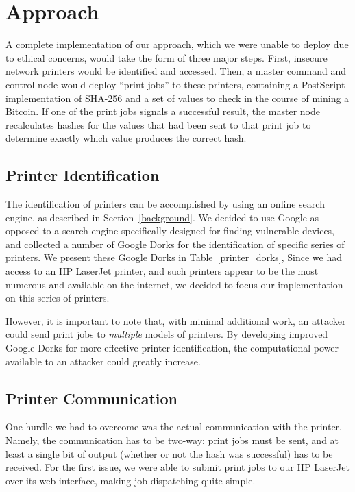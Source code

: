 \section{Approach}

A complete implementation of our approach, which we were unable to deploy due to ethical concerns, would take the form of three major steps.
First, insecure network printers would be identified and accessed.
Then, a master command and control node would deploy ``print jobs'' to these printers, containing a PostScript implementation of SHA-256 and a set of values to check in the course of mining a Bitcoin.
If one of the print jobs signals a successful result, the master node recalculates hashes for the values that had been sent to that print job to determine exactly which value produces the correct hash.

\subsection{Printer Identification}

The identification of printers can be accomplished by using an online search engine, as described in Section~\ref{background}.
We decided to use Google as opposed to a search engine specifically designed for finding vulnerable devices, and collected a number of Google Dorks for the identification of specific series of printers.
We present these Google Dorks in Table~\ref{printer_dorks}, 
Since we had access to an HP LaserJet printer, and such printers appear to be the most numerous and available on the internet, we decided to focus our implementation on this series of printers.

However, it is important to note that, with minimal additional work, an attacker could send print jobs to \emph{multiple} models of printers.
By developing improved Google Dorks for more effective printer identification, the computational power available to an attacker could greatly increase.

\subsection{Printer Communication}

One hurdle we had to overcome was the actual communication with the printer.
Namely, the communication has to be two-way: print jobs must be sent, and at least a single bit of output (whether or not the hash was successful) has to be received.
For the first issue, we were able to submit print jobs to our HP LaserJet over its web interface, making job dispatching quite simple.

